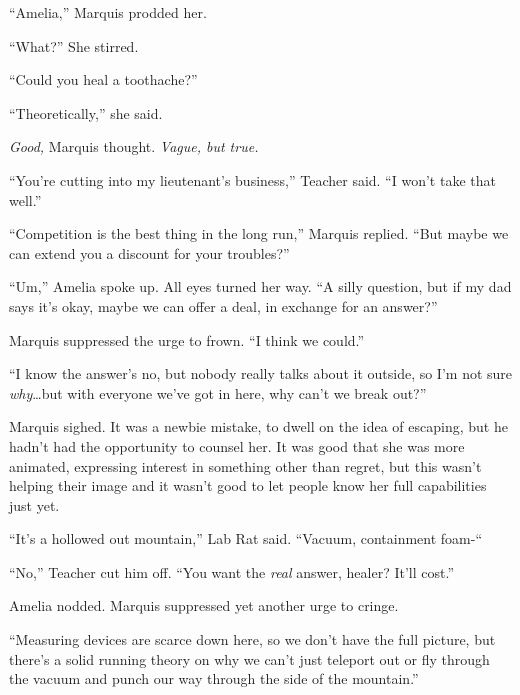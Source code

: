 ``Amelia,'' Marquis prodded her.



``What?''  She stirred.



``Could you heal a toothache?''



``Theoretically,'' she said.



\emph{Good,} Marquis thought.\emph{  Vague, but true.}



``You're cutting into my lieutenant's business,'' Teacher said.  ``I won't take that well.''



``Competition is the best thing in the long run,'' Marquis replied.  ``But maybe we can extend you a discount for your troubles?''



``Um,'' Amelia spoke up.  All eyes turned her way.  ``A silly question, but if my dad says it's okay, maybe we can offer a deal, in exchange for an answer?''



Marquis suppressed the urge to frown.  ``I think we could.''



``I know the answer's no, but nobody really talks about it outside, so I'm not sure \emph{why}\ldots but with everyone we've got in here, why can't we break out?''



Marquis sighed.  It was a newbie mistake, to dwell on the idea of escaping, but he hadn't had the opportunity to counsel her.  It was good that she was more animated, expressing interest in something other than regret, but this wasn't helping their image and it wasn't good to let people know her full capabilities just yet.



``It's a hollowed out mountain,'' Lab Rat said.  ``Vacuum, containment foam-``



``No,'' Teacher cut him off.  ``You want the \emph{real} answer, healer?  It'll cost.''



Amelia nodded.  Marquis suppressed yet another urge to cringe.



``Measuring devices are scarce down here, so we don't have the full picture, but there's a solid running theory on why we can't just teleport out or fly through the vacuum and punch our way through the side of the mountain.''



